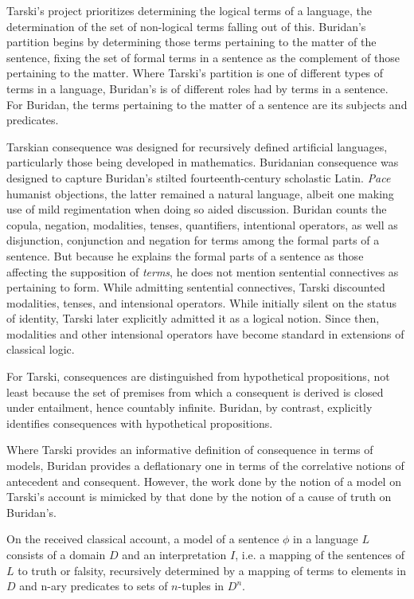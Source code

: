 \documentclass[]{article}
\begin{document}
Tarski's project prioritizes determining the logical terms of a language, the determination of the set of non-logical terms falling out of this. Buridan's partition begins by determining those terms pertaining to the matter of the sentence, fixing the set of formal terms in a sentence as the complement of those pertaining to the matter. Where Tarski's partition is one of different types of terms in a language, Buridan's is of different roles had by terms in a sentence. For Buridan, the terms pertaining to the matter of a sentence are its subjects and predicates.

Tarskian consequence was designed for recursively defined artificial languages, particularly those being developed in mathematics. Buridanian consequence was designed to capture Buridan's stilted fourteenth-century scholastic Latin. \textit{Pace} humanist objections, the latter remained a natural language, albeit one making use of mild regimentation when doing so aided discussion. Buridan counts the copula, negation, modalities, tenses, quantifiers, intentional operators, as well as disjunction, conjunction and negation for terms among the formal parts of a sentence. But because he explains the formal parts of a sentence as those affecting the supposition of \textit{terms}, he does not mention sentential connectives as pertaining to form. While admitting sentential connectives, Tarski discounted modalities, tenses, and intensional operators. While initially silent on the status of identity, Tarski later explicitly admitted it as a logical notion. Since then, modalities and other intensional operators have become standard in extensions of classical logic.

For Tarski, consequences are distinguished from hypothetical propositions, not least because the set of premises from which a consequent is derived is closed under entailment, hence countably infinite. Buridan, by contrast, explicitly identifies consequences with hypothetical propositions.


Where Tarski provides an informative definition of consequence in terms of models, Buridan provides a deflationary one in terms of the correlative notions of antecedent and consequent. However, the work done by the notion of a model on Tarski's account is mimicked by that done by the notion of a cause of truth on Buridan's. 

On the received classical account, a model of a sentence $\phi$ in a language $L$ consists of a domain $D$ and an interpretation $I$, i.e. a mapping of the sentences of $L$ to truth or falsity, recursively determined by a mapping of terms to elements in $D$ and n-ary predicates to sets of $n$-tuples in $D^{n}$.
\end{document}
